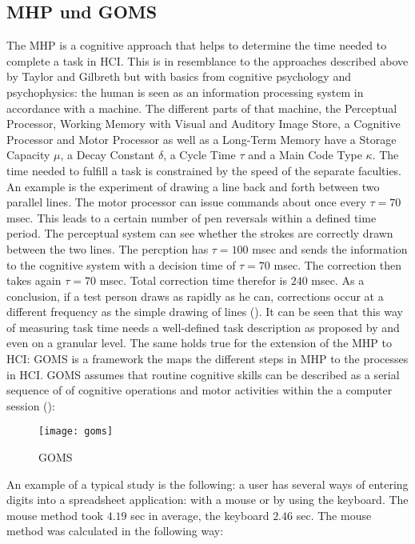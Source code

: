 \subsection{\ac{MHP} und \ac{GOMS}}
The \ac{MHP} is a cognitive approach that helps to determine the time needed to complete a task in \ac{HCI}. This is in resemblance to the approaches described above by Taylor and Gilbreth but with basics from cognitive psychology and psychophysics: the human is seen as an information processing system in accordance with a machine. The different parts of that machine, the Perceptual Processor, Working Memory with Visual and Auditory Image Store, a Cognitive Processor and Motor Processor as well as a Long-Term Memory have a Storage Capacity $\mu$, a Decay Constant $\delta$, a Cycle Time $\tau$ and a Main Code Type $\kappa$. The time needed to fulfill a task is constrained by the speed of the separate faculties. An example is the experiment of drawing a line back and forth between two parallel lines. The motor processor can issue commands about once every $\tau=70$ msec. This leads to a certain number of pen reversals within a defined time period. The perceptual system can see whether the strokes are correctly drawn between the two lines. The percption has $\tau=100$ msec and sends the information to the cognitive system with a decision time of $\tau=70$ msec. The correction then takes again $\tau=70$ msec. Total correction time therefor is $240$ msec. As a conclusion, if a test person draws as rapidly as he can, corrections occur at a different frequency as the simple drawing of lines (\cite{card1986model}). It can be seen that this way of measuring task time needs a well-defined task description as proposed by \cite{annett1967task} and even on a granular level. The same holds true for the extension of the \ac{MHP} to \ac{HCI}: \ac{GOMS} is a framework the maps the different steps in \ac{MHP} to the processes in \ac{HCI}. \ac{GOMS} assumes that routine cognitive skills can be described as a serial sequence of of cognitive operations and motor activities within the a computer session (\cite{olson1990growth}):



\begin{figure}[ht]
	\centering
  \texttt{[image: goms]}
	\caption{GOMS}
	\label{fig3}
\end{figure}

An example of a typical study is the following: a user has several ways of entering digits into a spreadsheet application: with a mouse or by using the keyboard. The mouse method took $4.19$ sec in average, the keyboard $2.46$ sec. The mouse method was calculated in the following way:

